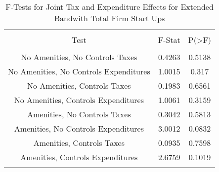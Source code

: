 
\begin{table}[!htbp] \centering 
  \caption{F-Tests for Joint Tax and Expenditure Effects for Extended Bandwith Total Firm Start Ups} 
  \label{--Ftests} 
\begin{tabular}{@{\extracolsep{5pt}} ccc} 
\\[-1.8ex]\hline 
\hline \\[-1.8ex] 
Test & F-Stat & P(\textgreater F) \\ 
\hline \\[-1.8ex] 
No Amenities, No Controls Taxes & 0.4263 & 0.5138 \\ 
No Amenities, No Controls Expenditures & 1.0015 & 0.317 \\ 
No Amenities, Controls Taxes & 0.1983 & 0.6561 \\ 
No Amenities, Controls Expenditures & 1.0061 & 0.3159 \\ 
Amenities, No Controls Taxes & 0.3042 & 0.5813 \\ 
Amenities, No Controls Expenditures & 3.0012 & 0.0832 \\ 
Amenities, Controls Taxes & 0.0935 & 0.7598 \\ 
Amenities, Controls Expenditures & 2.6759 & 0.1019 \\ 
\hline \\[-1.8ex] 
\end{tabular} 
\end{table} 
